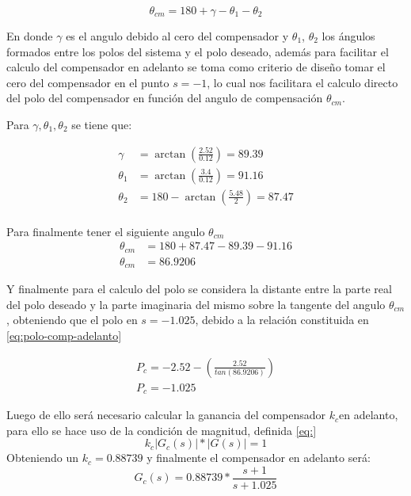 \documentclass[conference]{IEEEtran}
\begin{document}
	\begin{equation}
		\theta_{cm} = 180 + \gamma - \theta_1 - \theta_2
		\label{eq:angulo-compensacion}
	\end{equation}
	
	En donde $\gamma$ es el angulo debido al cero del compensador y $\theta_1$, $\theta_2$ los ángulos formados entre los polos del sistema y el polo deseado, además para facilitar el calculo del compensador en adelanto se toma como criterio de diseño tomar el cero del compensador en el punto $s = -1$, lo cual nos facilitara el calculo directo del polo del compensador en función del angulo de compensación $\theta_{cm}$.
	
	Para $\gamma, \theta_1, \theta_2$ se tiene que:
	
	\begin{align}
		\gamma &= \arctan(\frac{2.52}{0.12}) = 89.39 \\
		\theta_1 &= \arctan(\frac{3.4}{0.12}) = 91.16 \\
		\theta_2 &= 180 - \arctan(\frac{5.48}{2}) = 87.47\\
	\end{align}
	
	Para finalmente tener el siguiente angulo $\theta_{cm}$
	\begin{align}
		\theta_{cm} &= 180 + 87.47 - 89.39 - 91.16 \\
		\theta_{cm} &= 86.9206 \label{eq:angulo-compensacion-adelanto}
	\end{align}
	
	Y finalmente para el calculo del polo se considera la distante entre la parte real del polo deseado y la parte imaginaria del mismo sobre la tangente del angulo $\theta_{cm}$, obteniendo que el polo en $s = -1.025$, debido a la relación constituida en \ref{eq:polo-comp-adelanto}
	
	\begin{align}
		P_c = -2.52 -(\frac{2.52}{tan(86.9206)})\\
		P_c = -1.025
		\label{eq:polo-comp-adelanto} 
	\end{align}
	
	Luego de ello será necesario calcular la ganancia del compensador $k_c$en adelanto, para ello se hace uso de la condición de magnitud, definida \ref{eq:}
	\begin{equation}
		k_c|G_c(s)|*|G(s)| = 1
		\label{eq:condicion-magnitud}
	\end{equation}
	Obteniendo un $k_c = 0.88739$ y finalmente el compensador en adelanto será: 
	\begin{equation}
		G_c(s) =0.88739*\frac{s + 1}{s + 1.025}
	\end{equation}
	
\end{document}
